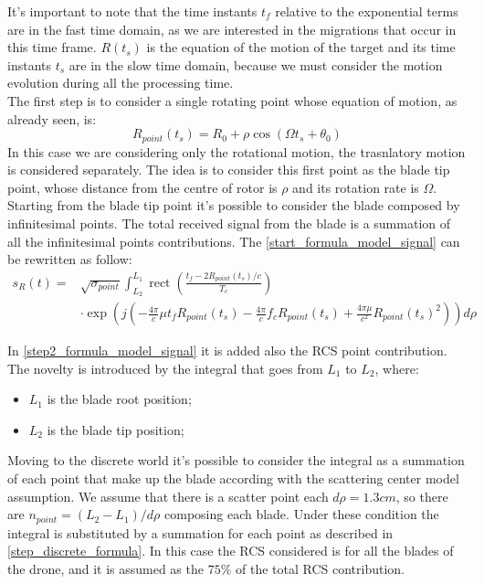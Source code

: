 It's important to note that the time instants $t_{f}$ relative to the exponential terms are in the fast time domain, as we are interested in the migrations that occur in this time frame.
$R(t_s)$ is the equation of the motion of the target and its time instants $t_{s}$ are in the slow time domain, because we must consider the motion evolution during all the processing time.\\
The first step is to consider a single rotating point whose equation of motion, as already seen, is:
\begin{equation}
R_{point}(t_s)=R_{0}+\rho \cos \left(\Omega t_{s}+\theta_{0}\right)
\end{equation}
In this case we are considering only the rotational motion, the trasnlatory motion is considered separately.
The idea is to consider this first point as the blade tip point, whose distance from the centre of rotor is $\rho$ and its rotation rate is $\Omega$. Starting from the blade tip point it's possible to consider the blade composed by infinitesimal points. The total received signal from the blade is a summation of all the infinitesimal points contributions. The \ref{start_formula_model_signal} can be rewritten as follow: 
\begin{equation}
\begin{aligned}
s_{R}(t)=& \sqrt{\sigma_{point}} \int_{L_{2}}^{L_{1}}\operatorname{rect}\left(\frac{t_{f}-2 R_{point}\left(t_{s}\right) / c}{T_{c}}\right) \\
& \cdot \exp \left(j\left(-\frac{4 \pi}{c} \mu t_{f} R_{point}\left(t_{s}\right)-\frac{4 \pi}{c} f_{c} R_{point}\left(t_{s}\right)+\frac{4 \pi \mu}{c^{2}} R_{point}\left(t_{s}\right)^{2}\right)\right) d\rho
\end{aligned}
\label{step2_formula_model_signal}
\end{equation}

In \ref{step2_formula_model_signal} it is added also the RCS point contribution. The novelty is introduced by the integral that goes from $L_{1}$ to $L_{2}$, where:
\begin{itemize}
    \item $L_{1}$ is the blade root position;
    
    \item $L_{2}$ is the blade tip position;
         
\end{itemize}
Moving to the discrete world it's possible to consider the integral as a summation of each point that make up the blade according with the scattering center model assumption. We assume that there is a scatter point each $d\rho=1.3 cm$, so there are $n_{point}=(L_2-L_1)/d\rho$ composing each blade. Under these condition the integral is substituted by a summation for each point as described in \ref{step_discrete_formula}. In this case the RCS considered is for all the blades of the drone, and it is assumed as the $75\%$ of the total RCS contribution.

